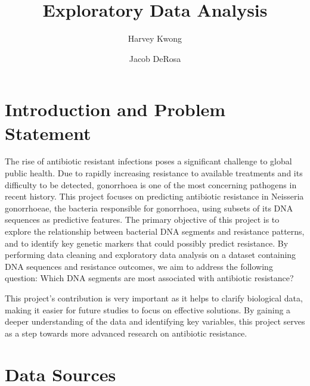 \documentclass[manuscript,screen,review, nonacm]{acmart}
\begin{document}
\title{Exploratory Data Analysis}

\author{Harvey Kwong}
\author{Jacob DeRosa}


\maketitle

\section{Introduction and Problem Statement}

    The rise of antibiotic resistant infections poses a significant challenge to global public health. Due to rapidly increasing resistance to 
available treatments and its difficulty to be detected, gonorrhoea is one of the most concerning pathogens in recent history. This project focuses on predicting antibiotic resistance 
in Neisseria gonorrhoeae, the bacteria responsible for gonorrhoea, using subsets of its DNA sequences as predictive features. 
The primary objective of this project is to explore the relationship between bacterial DNA segments and 
resistance patterns, and to identify key genetic markers that could possibly predict resistance. By performing data 
cleaning and exploratory data analysis on a dataset containing DNA sequences and resistance outcomes, 
we aim to address the following question: Which DNA segments are most associated with antibiotic resistance? 

    This project’s contribution is very important as it helps to clarify biological data, making it easier for 
future studies to focus on effective solutions. By gaining a deeper understanding of the data and identifying 
key variables, this project serves as a step towards more advanced research on antibiotic resistance.

\section{Data Sources}
\end{document}
